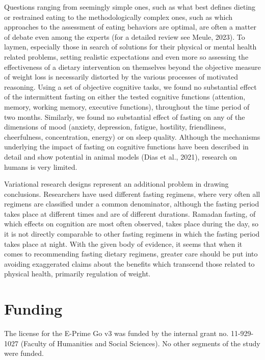 \documentclass[authordate, empirical,issue]{jote-new-article}
\begin{document}
Questions ranging from seemingly simple ones, such as what best defines dieting or restrained eating to the methodologically complex ones, such as which approaches to the assessment of eating behaviors are optimal, are often a matter of debate even among the experts (for a detailed review see Meule, 2023). To laymen, especially those in search of solutions for their physical or mental health related problems, setting realistic expectations and even more so assessing the effectiveness of a dietary intervention on themselves beyond the objective measure of weight loss is necessarily distorted by the various processes of motivated reasoning. Using a set of objective cognitive tasks, we found no substantial effect of the intermittent fasting on either the tested cognitive functions (attention, memory, working memory, executive functions), throughout the time period of two months. Similarly, we found no substantial effect of fasting on any of the dimensions of mood (anxiety, depression, fatigue, hostility, friendliness, cheerfulness, concentration, energy) or on sleep quality. Although the mechanisms underlying the impact of fasting on cognitive functions have been described in detail and show potential in animal models (Dias et al., 2021), research on humans is very limited.



Variational research designs represent an additional problem in drawing conclusions. Researchers have used different fasting regimens, where very often all regimens are classified under a common denominator, although the fasting period takes place at different times and are of different durations. Ramadan fasting, of which effects on cognition are most often observed, takes place during the day, so it is not directly comparable to other fasting regimens in which the fasting period takes place at night. With the given body of evidence, it seems that when it comes to recommending fasting dietary regimens, greater care should be put into avoiding exaggerated claims about the benefits which transcend those related to physical health, primarily regulation of weight.





\section{Funding}



The license for the E-Prime Go v3 was funded by the internal grant no. 11-929-1027 (Faculty of Humanities and Social Sciences). No other segments of the study were funded.
\end{document}
